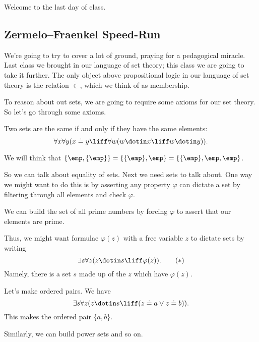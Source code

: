 \documentclass[../notes.tex]{subfiles}
\begin{document}

Welcome to the last day of class.

\subsection{Zermelo--Fraenkel Speed-Run}
We're going to try to cover a lot of ground, praying for a pedagogical miracle. Last class we brought in our language of set theory; this class we are going to take it further. The only object above propositional logic in our language of set theory is the relation $\dot\in$, which we think of as membership.

To reason about out sets, we are going to require some axioms for our set theory. So let's go through some axioms.
\begin{axiom}[Existentionality]
	Two sets are the same if and only if they have the same elements:
	\[\forall x\forall y(x\doteq y\liff\forall w(w\dotin x\liff w\dotin y)).\]
\end{axiom}
\begin{example}
	We will think that $\{\emp,\{\emp\}\}=\{\{\emp\},\emp\}=\{\{\emp\},\emp,\emp\}$.
\end{example}
So we can talk about equality of sets. Next we need sets to talk about. One way we might want to do this is by asserting any property $\varphi$ can dictate a set by filtering through all elements and check $\varphi$.
\begin{example}
	We can build the set of all prime numbers by forcing $\varphi$ to assert that our elements are prime.
\end{example}
Thus, we might want formulae $\varphi(z)$ with a free variable $z$ to dictate sets by writing
\[\exists s\forall z(z\dotin s\liff\varphi(z)).\tag{$*$}\label{eq:comprehension}\]
Namely, there is a set $s$ made up of the $z$ which have $\varphi(z)$.
\begin{example}
	Let's make ordered pairs. We have
	\[\exists s\forall z(z\dotin s\liff(z\doteq a\lor z\doteq b)).\]
	This makes the ordered pair $\{a,b\}$.
\end{example}
Similarly, we can build power sets and so on.
\end{document}

